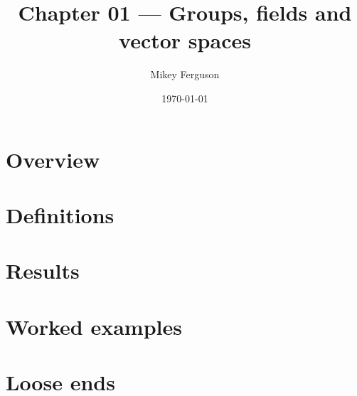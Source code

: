 \documentclass[11pt]{article}
\title{Chapter 01 --- Groups, fields and vector spaces}
\author{Mikey Ferguson}
\date{\today}
\begin{document}
\maketitle
\tableofcontents
\bigskip

\section{Overview}

\section{Definitions}

\section{Results}

\section{Worked examples}

\section{Loose ends}
\end{document}
